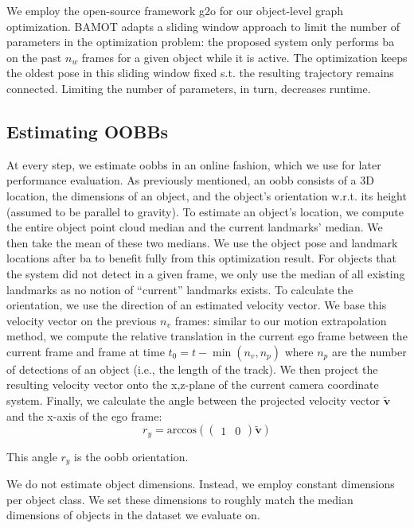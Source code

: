 \documentclass[headsepline, hidelinks, footsepline, footinclude=false, oneside, fontsize=11pt, paper=a4, listof=totoc, bibliography=totoc]{scrbook}
\begin{document}
We employ the open-source framework g2o \cite{kummerleG2oGeneralFramework2011} for our object-level graph optimization.
BAMOT adapts a sliding window approach to limit the number of parameters in the optimization problem: 
the proposed system only performs \gls{ba} on the past \(n_w\) frames for a given object while it is active. 
The optimization keeps the oldest pose in this sliding window fixed s.t. the resulting trajectory remains connected.
Limiting the number of parameters, in turn, decreases runtime.

\subsection{Estimating OOBBs}
\label{sec:org9376cc2}
At every step, we estimate \glspl{oobb} in an online fashion, which we use for later performance evaluation.
As previously mentioned, an \gls{oobb} consists of a 3D location, the dimensions of an object, and the object's orientation w.r.t. its height (assumed to be parallel to gravity).
To estimate an object's location, we compute the entire object point cloud median and the current landmarks' median. We then take the mean of these two medians.
We use the object pose and landmark locations after \gls{ba} to benefit fully from this optimization result.
For objects that the system did not detect in a given frame, we only use the median of all existing landmarks as no notion of ``current'' landmarks exists.
To calculate the orientation, we use the direction of an estimated velocity vector. We base this velocity vector on the previous \(n_v\) frames: 
similar to our motion extrapolation method, we compute the relative translation in the current ego frame between the current frame and frame at time \(t_0 = t - \min(n_v, n_p)\) where \(n_p\) are the number of detections
of an object (i.e., the length of the track). We then project the resulting velocity vector onto the x,z-plane of the current camera coordinate system.
Finally, we calculate the angle between the projected velocity vector \(\tilde{\mathbf{v}}\) and the x-axis of the ego frame:
\begin{equation}
r_{y} = \text{arccos}(\begin{pmatrix}1 & 0 \end{pmatrix} \tilde{\mathbf{v}})
\end{equation}

This angle \(r_{y}\) is the \gls{oobb} orientation.

We do not estimate object dimensions. Instead, we employ constant dimensions per object class. 
We set these dimensions to roughly match the median dimensions of objects in the dataset we evaluate on.
\end{document}
